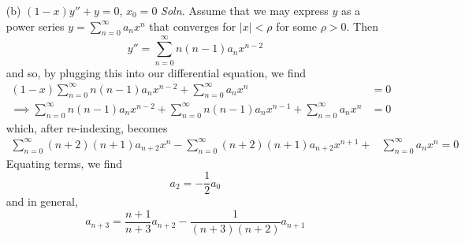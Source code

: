 \documentclass{article}
\begin{document}
\begin{itemize}
\begin{itemize}
        \item[(b)] $(1 - x)y'' + y = 0$, \hspace{0.34cm} $x_0 = 0$
        \newline\newline
        \textit{Soln.} Assume that we may express $y$ as a power series ${\displaystyle y = \sum_{n=0}^{\infty}a_nx^n}$ that converges for $|x| < \rho$ for some $\rho > 0$. Then
        \[y'' = \sum_{n = 0}^{\infty} n(n-1)a_nx^{n-2}\]
        and so, by plugging this into our differential equation, we find
        \begin{align*}
            (1 - x)\sum_{n = 0}^{\infty} n(n-1)a_nx^{n-2} + \sum_{n = 0}^{\infty}a_nx^n &= 0\\
            \implies \sum_{n = 0}^{\infty} n(n-1)a_nx^{n-2} + \sum_{n = 0}^{\infty}n(n-1)a_nx^{n-1} + \sum_{n=0}^{\infty} a_nx^n &= 0
        \end{align*}
        which, after re-indexing, becomes
        \begin{align*}
            \sum_{n = 0}^{\infty}(n+2)(n+1)a_{n+2}x^n - \sum_{n = 0}^{\infty}(n+2)(n+1)a_{n+2}x^{n+1} + &\sum_{n = 0}^{\infty} a_n x^n = 0
        \end{align*}
        Equating terms, we find
        \[a_2 = -\frac{1}{2}a_0\]
        and in general,
        \[a_{n+3} = \frac{n+1}{n+3}a_{n+2} - \frac{1}{(n + 3)(n + 2)}a_{n+1}\]
        

\end{itemize}
\end{itemize}
\end{document}
